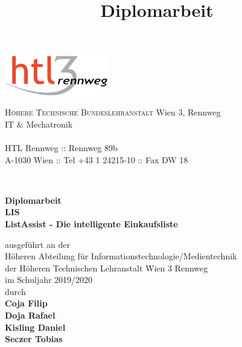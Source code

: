 \documentclass[
    headings=optiontotocandhead,%
    twoside,
    numbers=noenddot,%
    toc=flat, %
    12pt, %
    titlepage, %
    parskip=full, %
    listof=totoc, %
    listof=flat, %
    numbers=noenddot, %
    bibliography=totoc, %
    a4paper,DIV=14,
    BCOR=15mm,
]{scrbook}
\begin{document}
\newcommand{\kapitelautor}{}


\frontmatter %
\title{Diplomarbeit}
\begin{titlepage}
\begin{minipage}[b]{1\columnwidth}
\parbox[b]{50mm}{\includegraphics[width=45mm]{images/HTL3RLogoRGB}}
\hfill
\parbox[b]{130mm}{\footnotesize \textsc{Höhere Technische Bundeslehranstalt} Wien 3, Rennweg\\
IT \& Mechatronik\\
\\
HTL Rennweg :: Rennweg 89b\\
A-1030 Wien :: Tel +43 1 24215-10 :: Fax DW 18
}\\
\mbox{}
\end{minipage}

\vspace{1cm}


\begin{center}
\textbf{\LARGE{}Diplomarbeit}{\large{}}\\
{\large{}\vspace{15mm}
 }\textbf{\large{}LIS}\\
\textbf{\large{}ListAssist - Die intelligente Einkaufsliste}\\
 \vspace{15mm}

 ausgeführt an der\\
 Höheren Abteilung für Informationstechnologie/Medientechnik\\
 der Höheren Technischen Lehranstalt Wien 3 Rennweg\\
 \vspace{1cm}
 im Schuljahr 2019/2020\\

 \vspace{1cm}
 durch\\
 \vspace{0.5cm}
\textbf{\large{}Coja Filip}\\
\textbf{\large{}Doja Rafael}\\
\textbf{\large{}Kisling Daniel}\\
\textbf{\large{}Seczer Tobias}\\


\end{center}
\end{titlepage}
\end{document}
